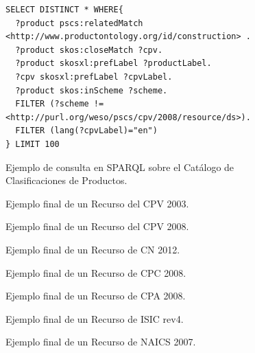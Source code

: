 \begin{figure}[!htp]
\begin{lstlisting} 
SELECT DISTINCT * WHERE{
  ?product pscs:relatedMatch <http://www.productontology.org/id/construction> .
  ?product skos:closeMatch ?cpv.
  ?product skosxl:prefLabel ?productLabel.
  ?cpv skosxl:prefLabel ?cpvLabel.
  ?product skos:inScheme ?scheme.
  FILTER (?scheme != <http://purl.org/weso/pscs/cpv/2008/resource/ds>).
  FILTER (lang(?cpvLabel)="en")
} LIMIT 100
\end{lstlisting}
	\caption{Ejemplo de consulta en SPARQL sobre el Catálogo de Clasificaciones de Productos.}
	\label{fig:pscs-sparql-query}
\end{figure}



\begin{figure}[!htp]

	\caption{Ejemplo final de un Recurso del CPV 2003.}
	\label{fig:pscs-example-cpv-2003}
\end{figure}

\begin{figure}[!htp]
	
	\caption{Ejemplo final de un Recurso del CPV 2008.}
	\label{fig:pscs-example-cpv-2008}
\end{figure}

\begin{figure}[!htp]

	\caption{Ejemplo final de un Recurso de CN 2012.}
	\label{fig:pscs-example-cn-2012}
\end{figure}

\begin{figure}[!htp]

	\caption{Ejemplo final de un Recurso de CPC 2008.}
	\label{fig:pscs-example-cpc-2008}
\end{figure}


\begin{figure}[!htp]

	\caption{Ejemplo final de un Recurso de CPA 2008.}
	\label{fig:pscs-example-cpa-2008}
\end{figure}


\begin{figure}[!htp]

	\caption{Ejemplo final de un Recurso de ISIC rev4.}
	\label{fig:pscs-example-isic-rev4}
\end{figure}


\begin{figure}[!htp]

	\caption{Ejemplo final de un Recurso de NAICS 2007.}
	\label{fig:pscs-example-naics-2007}
\end{figure}


